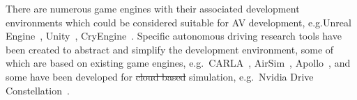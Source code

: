 \documentclass[letterpaper, 10 pt, journal, twoside]{IEEEtran}
\providecommand{\DIFaddtex}[1]{{\protect\color{blue}\uwave{#1}}} %
\providecommand{\DIFdeltex}[1]{{\protect\color{red}\sout{#1}}}                      %
\providecommand{\DIFaddbegin}{} %
\providecommand{\DIFaddend}{} %
\providecommand{\DIFdelbegin}{} %
\providecommand{\DIFdelend}{} %
\providecommand{\DIFadd}[1]{\texorpdfstring{\DIFaddtex{#1}}{#1}} %
\providecommand{\DIFdel}[1]{\texorpdfstring{\DIFdeltex{#1}}{}} %
\begin{document}
There are numerous game engines with their associated development environments which could be considered suitable for AV development, e.g.\DIFaddbegin \DIFadd{\ }\DIFaddend Unreal Engine~\cite{UE4_main_website}, Unity~\cite{Unity_main_website}, CryEngine~\cite{CryEngine_main_website}. Specific autonomous driving research tools have been created to abstract and simplify the development environment, some of which are based on existing game engines, e.g.\ CARLA~\cite{carla_main_website}, AirSim~\cite{AirSim_main_website}, Apollo~\cite{Apollo_main_website}, and some have been developed for \DIFdelbegin \DIFdel{cloud based }\DIFdelend \DIFaddbegin \DIFadd{cloud-based }\DIFaddend simulation, e.g.\ Nvidia Drive Constellation~\cite{nvidia_constellation}.
\end{document}
